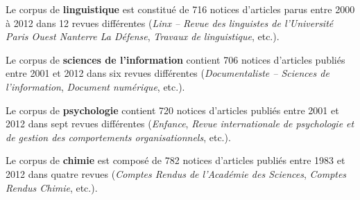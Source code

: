   Le corpus de \textbf{linguistique} est constitué de 716 notices d'articles
  parus entre 2000 à 2012 dans 12 revues différentes (\textit{Linx -- Revue des
  linguistes de l'Université Paris Ouest Nanterre La Défense}, \textit{Travaux
  de linguistique}, etc.).

  Le corpus de \textbf{sciences de l'information} contient 706 notices
  d'articles publiés entre 2001 et 2012 dans six revues différentes
  (\textit{Documentaliste -- Sciences de l'information}, \textit{Document
  numérique}, etc.).

  Le corpus de \textbf{psychologie} contient 720 notices d'articles publiés
  entre 2001 et 2012 dans sept revues différentes (\textit{Enfance},
  \textit{Revue internationale de psychologie et de gestion des comportements
  organisationnels}, etc.).

  Le corpus de \textbf{chimie} est composé de 782 notices d'articles publiés
  entre 1983 et 2012 dans quatre revues (\textit{Comptes Rendus de l'Académie
  des Sciences}, \textit{Comptes Rendus Chimie}, etc.).


